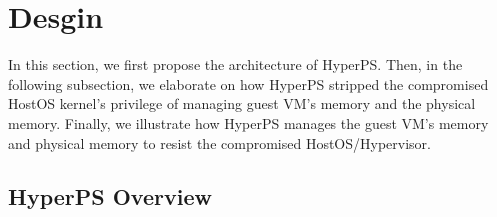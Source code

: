 \section{Desgin}%
\label{sec:desgin}

In this section, we first propose the architecture of HyperPS. Then, in the following subsection, we elaborate on how HyperPS stripped the compromised HostOS kernel's privilege of managing guest VM's memory and the physical memory. Finally, we illustrate how HyperPS manages the guest VM's memory and physical memory to resist the compromised HostOS/Hypervisor.


\subsection{HyperPS Overview}%
\label{sub:hyperps_overview}




